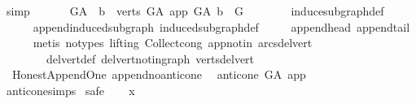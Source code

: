 \begin{isabellebody}
\ simp\ \isanewline
\ \ \isamarkupfalse%
\ \isamarkupfalse%
\ {\isachardoublequoteopen}G{\isacharunderscore}{\kern0pt}A\ {\isasymrestriction}\ {\isacharbraceleft}{\kern0pt}b\ {\isasymin}\ verts\ G{\isacharunderscore}{\kern0pt}A{\isachardot}{\kern0pt}\ app\ {\isasymrightarrow}\isactrlsup {\isacharplus}{\kern0pt}\isactrlbsub G{\isacharunderscore}{\kern0pt}A\isactrlesub \ b{\isacharbraceright}{\kern0pt}\ {\isacharequal}{\kern0pt}\ G\ {\isachardoublequoteclose}\ \isanewline
\ \ \ \ \isamarkupfalse%
\ induce{\isacharunderscore}{\kern0pt}subgraph{\isacharunderscore}{\kern0pt}def\ \isanewline
\ \ \ \ \isamarkupfalse%
\ append{\isacharunderscore}{\kern0pt}induced{\isacharunderscore}{\kern0pt}subgraph\ induced{\isacharunderscore}{\kern0pt}subgraph{\isacharunderscore}{\kern0pt}def\ \isanewline
\ \ \ \ append{\isacharunderscore}{\kern0pt}head\ append{\isacharunderscore}{\kern0pt}tail\isanewline
\ \ \ \ \isamarkupfalse%
\ {\isacharparenleft}{\kern0pt}metis\ {\isacharparenleft}{\kern0pt}no{\isacharunderscore}{\kern0pt}types{\isacharcomma}{\kern0pt}\ lifting{\isacharparenright}{\kern0pt}\ Collect{\isacharunderscore}{\kern0pt}cong\ app{\isacharunderscore}{\kern0pt}notin\ arcs{\isacharunderscore}{\kern0pt}del{\isacharunderscore}{\kern0pt}vert\isanewline
\ \ \ \ \ \ \ \ del{\isacharunderscore}{\kern0pt}vert{\isacharunderscore}{\kern0pt}def\ del{\isacharunderscore}{\kern0pt}vert{\isacharunderscore}{\kern0pt}not{\isacharunderscore}{\kern0pt}in{\isacharunderscore}{\kern0pt}graph\ verts{\isacharunderscore}{\kern0pt}del{\isacharunderscore}{\kern0pt}vert{\isacharparenright}{\kern0pt}\ \isanewline
{}\isamarkupfalse%
%
\endisatagproof
{\isafoldproof}%
%
\isadelimproof
\isanewline
%
\endisadelimproof
\isanewline
{}\isamarkupfalse%
\ {\isacharparenleft}{\kern0pt}\ Honest{\isacharunderscore}{\kern0pt}Append{\isacharunderscore}{\kern0pt}One{\isacharparenright}{\kern0pt}\ append{\isacharunderscore}{\kern0pt}no{\isacharunderscore}{\kern0pt}anticone{\isacharcolon}{\kern0pt}\isanewline
\ \ {\isachardoublequoteopen}anticone\ G{\isacharunderscore}{\kern0pt}A\ app\ {\isacharequal}{\kern0pt}\ {\isacharbraceleft}{\kern0pt}{\isacharbraceright}{\kern0pt}{\isachardoublequoteclose}\isanewline
%
\isadelimproof
\ \ %
\endisadelimproof
%
\isatagproof
{}\isamarkupfalse%
\ anticone{\isachardot}{\kern0pt}simps\isanewline
{}\isamarkupfalse%
\ safe\isanewline
\ \ \isamarkupfalse%
\ x\ \isanewline
\ \ \isamarkupfalse%

\end{isabellebody}

